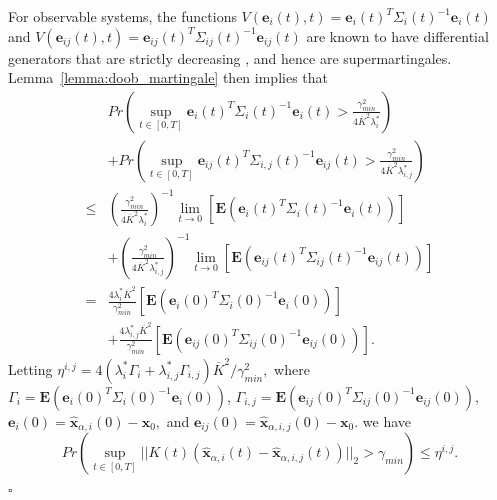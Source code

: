 \documentclass[journal]{IEEEtran}
\begin{document}
For observable systems, the functions $V(\mathbf{e}_i(t),t) = \mathbf{e}_i(t)^{T}\Sigma_i(t)^{-1}\mathbf{e}_i(t)$ and $V(\mathbf{e}_{ij}(t),t) = \mathbf{e}_{ij}(t)^{T}\Sigma_{ij}(t)^{-1}\mathbf{e}_{ij}(t)$ are known to have differential generators that are strictly decreasing \cite{reif2000stochastic}, and hence are supermartingales. Lemma~\ref{lemma:doob_martingale} then implies that 
\begin{equation*}
    \begin{array}{ll}
        &Pr(\sup_{t \in [0,T]} \mathbf{e}_i(t)^T{\Sigma_i(t)}^{-1}\mathbf{e}_i(t) > \frac{\gamma_{min}^2}{4\overline{K}^2\lambda_i^{\ast}})  \\
        &+ Pr(\sup_{t \in [0,T]} \mathbf{e}_{ij}(t)^T{\Sigma_{i,j}(t)}^{-1}\mathbf{e}_{ij}(t) > \frac{\gamma_{min}^2}{4\overline{K}^2\lambda_{i,j}^{\ast}})  \\
        \leq &\left(\frac{\gamma_{min}^{2}}{4\overline{K}^{2}\lambda_i^{\ast}}\right)^{-1}\lim_{t \rightarrow 0}{\left[\mathbf{E}\left(\mathbf{e}_i(t)^T{\Sigma_i(t)}^{-1}\mathbf{e}_i(t)\right)\right]}  \\
        &+ \left(\frac{\gamma_{min}^{2}}{4\overline{K}^{2}\lambda_{i,j}^{\ast}}\right)^{-1}\lim_{t \rightarrow 0}{\left[\mathbf{E}\left(\mathbf{e}_{ij}(t)^T{\Sigma_{ij}(t)}^{-1}\mathbf{e}_{ij}(t)\right)\right]} \\
        = &\frac{4\lambda_i^{\ast}\overline{K}^{2}}{\gamma_{min}^{2}}{\left[\mathbf{E}\left(\mathbf{e}_i(0)^T{\Sigma_i(0)}^{-1}\mathbf{e}_i(0)\right)\right]} \\
        &+ \frac{4\lambda_{i,j}^{\ast}\overline{K}^{2}}{\gamma_{min}^{2}}{\left[\mathbf{E}\left(\mathbf{e}_{ij}(0)^T{\Sigma_{ij}(0)}^{-1}\mathbf{e}_{ij}(0)\right)\right]}.
    \end{array}
\end{equation*}
Letting $\eta^{i,j} = {4(\lambda_i^{\ast}\Gamma_i + \lambda_{i,j}^{\ast}\Gamma_{i,j})\overline{K}^{2}}/{\gamma_{min}^{2}},$ where $\Gamma_i = \mathbf{E}\left(\mathbf{e}_i(0)^T{\Sigma_i(0)}^{-1}\mathbf{e}_i(0)\right)$, $\Gamma_{i,j} = \mathbf{E}\left(\mathbf{e}_{ij}(0)^T{\Sigma_{ij}(0)}^{-1}\mathbf{e}_{ij}(0)\right),$ $\mathbf{e}_i(0) = \hat{\mathbf{x}}_{\alpha,i}(0) - \mathbf{x}_0,$ and $\mathbf{e}_{ij}(0) = \hat{\mathbf{x}}_{\alpha,i,j}(0) - \mathbf{x}_0.$ we have 
\begin{equation*}
    Pr\left(\sup_{t \in [0,T]} ||K(t)\left(\mathbf{\hat{x}}_{\alpha,i}(t) - \mathbf{\hat{x}}_{\alpha,i,j}(t)\right) ||_2 > \gamma_{min} \right) \leq \eta^{i,j}.
\end{equation*}
\begin{flushright}
$\square$
\end{flushright}

\end{document}
